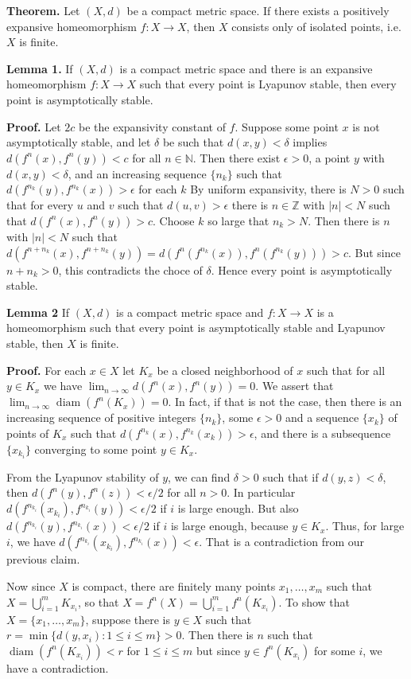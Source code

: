 \documentclass[12pt]{article}
\newcommand{\N}{\mathbb{N}}
\newcommand{\Z}{\mathbb{Z}}
\newcommand{\diam}{\operatorname{diam}}
\begin{document}
\textbf{Theorem.} Let $(X,d)$ be a compact metric space. If there exists a
positively expansive homeomorphism $f\colon X\to X$, then $X$ consists only of isolated
points, i.e. $X$ is finite.

\textbf{Lemma 1.} If $(X,d)$ is a compact metric space and there is an expansive homeomorphism $f\colon X\to X$ such that every point is Lyapunov stable, then every point is asymptotically stable.

\textbf{Proof.}  Let $2c$ be the expansivity constant of $f$.
Suppose some point $x$ is not asymptotically stable, and let $\delta$ be such
that $d(x,y)<\delta$ implies $d(f^n(x),f^n(y))<c$ for all $n\in \N$. Then there exist $\epsilon>0$, a point $y$ with $d(x,y)<\delta$, and an increasing sequence $\{n_k\}$ such that $d(f^{n_k}(y),f^{n_k}(x))>\epsilon$ for each $k$
By uniform expansivity, there is $N>0$ such that for every $u$ and $v$ such that $d(u,v)>\epsilon$ there is $n\in \Z$ with $|n|<N$ such that $d(f^n(x),f^n(y))>c$.  
Choose $k$ so large that $n_k>N$. Then there is $n$ with $|n|<N$ such that $d(f^{n+n_k}(x),f^{n+n_k}(y))=d(f^n(f^{n_k}(x)),f^n(f^{n_k}(y))) > c$. But since $n+n_k>0$, this contradicts the choce of $\delta$. Hence every point is asymptotically stable.

\textbf{Lemma 2} If $(X,d)$ is a compact metric space and $f\colon X\to X$ is a homeomorphism such that every point is asymptotically stable and Lyapunov stable, then $X$ is finite.

\textbf{Proof.} 
For each $x\in X$ let $K_x$ be a closed neighborhood of $x$ such that for all $y\in K_x$ we have $\lim_{n\to\infty} d(f^n(x),f^n(y)) = 0$. We assert that $\lim_{n\to\infty}\diam(f^n(K_x))=0$. In fact,
if that is not the case, then there is an increasing sequence of positive integers $\{n_k\}$, some $\epsilon>0$ and a sequence $\{x_k\}$ of points of $K_x$ such that $d(f^{n_k}(x),f^{n_k}(x_k))>\epsilon$, and there is a subsequence $\{x_{k_i}\}$ converging to some point $y\in K_x$. 

From the Lyapunov stability of $y$, we can find $\delta>0$ such that if $d(y,z)<\delta$, then $d(f^n(y),f^n(z))<\epsilon/2$ for all $n>0$. In particular $d(f^{n_{k_i}}(x_{k_i}),f^{n_{k_i}}(y))<\epsilon/2$ if $i$ is large enough. But also $d(f^{n_{k_i}}(y), f^{n_{k_i}}(x))<\epsilon/2$ if $i$ is large enough, because $y\in K_x$. Thus, for large $i$, we have $d(f^{n_{k_i}}(x_{k_i}),f^{n_{k_i}}(x))<\epsilon$. That is a contradiction from our previous claim.

Now since $X$ is compact, there are finitely many points $x_1,\dots,x_m$ such that $X=\bigcup_{i=1}^m K_{x_i}$,
so that $X=f^n(X)=\bigcup_{i=1}^m f^n(K_{x_i})$. To show that $X=\{x_1,\dots,x_m\}$, suppose there is $y\in X$ such that $r=\min\{d(y,x_i):1\leq i\leq m\}>0$. Then there is $n$ such that $\diam(f^n(K_{x_i}))<r$ for $1\leq i\leq m$
but since $y\in f^n(K_{x_i})$ for some $i$, we have a contradiction.
\end{document}

